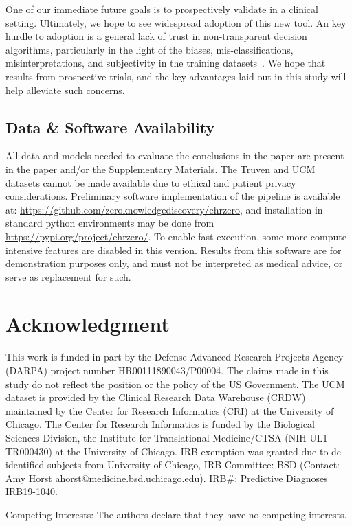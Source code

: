\documentclass[onecolumn,10pt]{IEEEtran}
\begin{document}
{\HCOL One of our immediate future  goals  is to  prospectively validate \acor  in a clinical setting. Ultimately, we hope to see widespread adoption of this new tool. An key hurdle to adoption is a general lack of  trust in  non-transparent decision algorithms, particularly in the light of the biases, mis-classifications, misinterpretations, and subjectivity in the training datasets~\cite{cheng2020there}. We hope that results from prospective trials, and the key advantages laid out in this study will help alleviate such concerns.
}


\subsection*{Data \& Software Availability} 
All data and models needed to evaluate the conclusions in the paper are present in the paper and/or the Supplementary Materials. The Truven and UCM datasets  cannot be made available due to ethical and patient privacy considerations. Preliminary software implementation of the pipeline is available at: 
\url{https://github.com/zeroknowledgediscovery/ehrzero}, and installation in standard python environments may be done from \url{https://pypi.org/project/ehrzero/}. To enable fast execution, some more compute intensive features are disabled in this version. Results from this software are for demonstration purposes only, and must not be interpreted as medical advice, or serve as replacement for such.


\section*{Acknowledgment}
This work is funded in part by the Defense Advanced Research Projects Agency (DARPA) project number  HR00111890043/P00004. The claims made in this study  do not  reflect the position or the policy of the US Government. The UCM dataset is provided by the Clinical Research Data Warehouse (CRDW) maintained by the Center for Research Informatics (CRI) at the  University of Chicago. The Center for Research Informatics is funded by the Biological Sciences Division, the Institute for Translational Medicine/CTSA (NIH UL1 TR000430) at the University of Chicago. IRB exemption was granted due to de-identified subjects from University of Chicago, IRB Committee: BSD (Contact: Amy Horst
ahorst@medicine.bsd.uchicago.edu). IRB\#: Predictive Diagnoses IRB19-1040.

Competing Interests: The authors declare that they have no competing interests.
\end{document}

